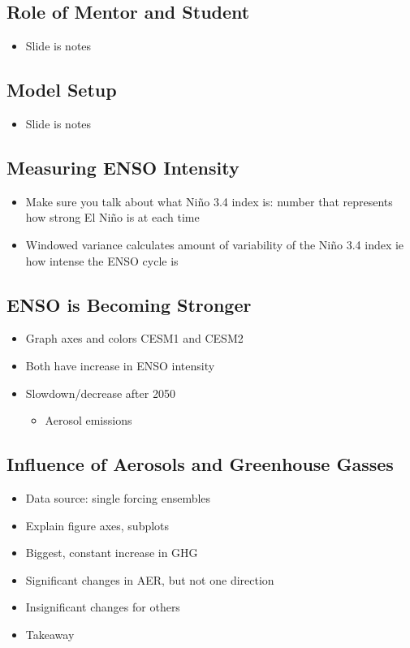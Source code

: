 \documentclass[little]{basic}
\begin{document}
\subsection*{Role of Mentor and Student}
\label{sec:org996c977}
\begin{itemize}
\item Slide is notes
\end{itemize}
\subsection*{Model Setup}
\label{sec:org8ffde0b}
\begin{itemize}
\item Slide is notes
\end{itemize}
\subsection*{Measuring ENSO Intensity}
\label{sec:org8f32f98}
\begin{itemize}
\item Make sure you talk about what Niño 3.4 index is: number that represents how strong El Niño is at each time
\item Windowed variance calculates amount of variability of the Niño 3.4 index ie how intense the ENSO cycle is
\end{itemize}
\subsection*{ENSO is Becoming Stronger}
\label{sec:org5844385}
\begin{itemize}
\item Graph axes and colors CESM1 and CESM2
\item Both have increase in ENSO intensity
\item Slowdown/decrease after 2050
\begin{itemize}
\item Aerosol emissions
\end{itemize}
\end{itemize}
\subsection*{Influence of Aerosols and Greenhouse Gasses}
\label{sec:org80018e5}
\begin{itemize}
\item Data source: single forcing ensembles
\item Explain figure axes, subplots
\item Biggest, constant increase in GHG
\item Significant changes in AER, but not one direction
\item Insignificant changes for others
\item Takeaway
\end{itemize}
\end{document}
